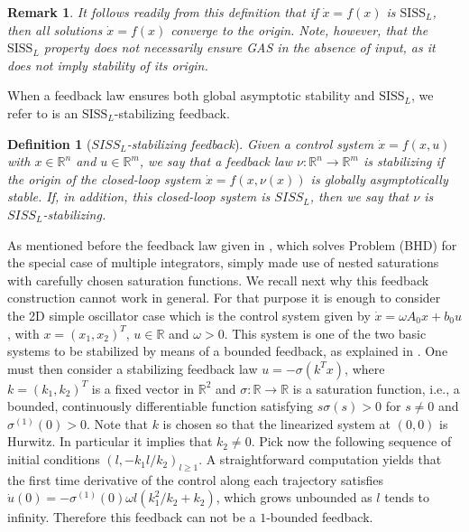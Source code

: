 \documentclass[letterpaper, 10pt]{article}
\newtheorem{defi}{Definition}
\newtheorem{remark}{Remark}
\newcommand{\reels}{\mathbb{R}}
\newcommand{\siss}{\text{SISS}}
\begin{document}
 \begin{remark}\label{rem1}
It follows readily from this definition that if $\dot{x}=f(x)$ is $\siss_L$, then all solutions $\dot{x}=f(x)$ converge to the origin. Note, however, that the $\siss_L$ property does not necessarily ensure GAS in the absence of input, as it does not imply stability of its origin.
\end{remark}

When a feedback law ensures both global asymptotic stability and $\siss_L$, we refer to is an $\siss_L$-stabilizing feedback.

\begin{defi}[\emph{$SISS_L$-stabilizing feedback}]\label{def:sissfeedback}
Given a control system $\dot{x}=f(x,u)$ with $x\in\reels^n$ and $u\in\reels^m$, we say that a feedback law $\nu:\reels^n\to\reels^m$ is \emph{stabilizing} if the origin of the closed-loop system $\dot{x}=f(x,\nu(x))$ is globally asymptotically stable. If, in addition, this closed-loop system is $SISS_L$, then we say that $\nu$ is \emph{ $SISS_L$-stabilizing}.
\end{defi}




As mentioned before the feedback law given in  \cite{LCC1}, which solves Problem (BHD) for the special case of multiple integrators, simply made use of nested saturations with carefully chosen saturation functions. We recall next why this feedback construction cannot work in general. For that purpose it is enough to consider the 2D simple oscillator case which is the control system given by $\dot{x}= \omega A_0 x + b_0 u$, with $x=(x_1, x_2)^T$, $u\in\reels$ and $\omega>0$. This system is one of the two basic systems to be stabilized by means of a bounded feedback, as explained in \cite{SSY}. One must then consider a stabilizing feedback law $u= - \sigma( k^Tx) $, where $k=(k_1,k_2)^T$ is a fixed vector in $\reels^2$ and $\sigma:\reels\rightarrow \reels$ is a saturation function, i.e., a bounded, continuously differentiable function satisfying $s \sigma(s) >0$ for $s \neq 0$ and $\sigma^{(1)}(0)>0$. Note that $k$ is chosen so that the linearized system at $(0,0)$ is Hurwitz. In particular it implies that $k_2\neq 0$. Pick now the following sequence of initial conditions $(l,- k_1l/ k_2)_{l\geq 1}$. A straightforward computation yields that the first time derivative of the control along each trajectory satisfies $\dot{u}(0) = - \sigma^{(1)}(0) \omega l( k_1^2 /k_ 2 + k_2)$, which grows unbounded as $l$ tends to infinity. Therefore this feedback can not be a $1$-bounded feedback.
\end{document}
